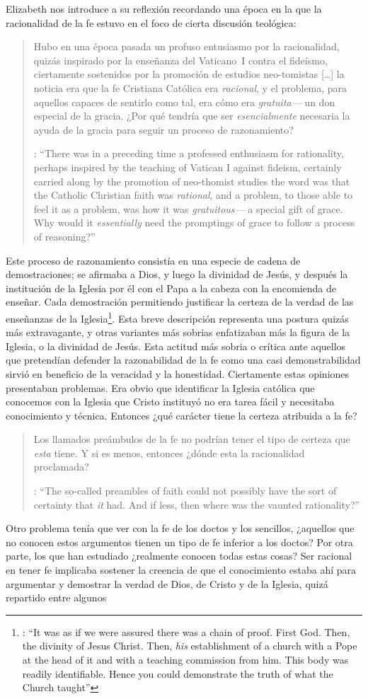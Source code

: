 Elizabeth nos introduce a su reflexión recordando una época en la que la racionalidad de la fe estuvo en el foco de cierta discusión teológica: \blockquote[{\cite[113]{anscombe1981erp:faith}}: \enquote{There was in a preceding time a professed enthusiasm for rationality, perhaps inspired by the teaching of Vatican I against fideism, certainly carried along by the promotion of neo-thomist studies \textelp{} the word was that the Catholic Christian faith was \emph{rational}, and a problem, to those able to feel it as a problem, was how it was \emph{gratuitous}\,---\,a special gift of grace. Why would it \emph{essentially} need the promptings of grace to follow a process of reasoning?}]{Hubo en una época pasada un profuso entusiasmo por la racionalidad, quizás inspirado por la enseñanza del Vaticano~I contra el fideísmo, ciertamente sostenidos por la promoción de estudios neo-tomistas [\ldots] la noticia era que la fe Cristiana Católica era \emph{racional}, y el problema, para aquellos capaces de sentirlo como tal, era cómo era \emph{gratuita}\,---\,un don especial de la gracia. ¿Por qué tendría que ser \emph{esencialmente} necesaria la ayuda de la gracia para seguir un proceso de razonamiento?}. Este proceso de razonamiento consistía en una especie de cadena de demostraciones; se afirmaba a Dios, y luego la divinidad de Jesús, y después la institución de la Iglesia por él con el Papa a la cabeza con la encomienda de enseñar. Cada demostración permitiendo justificar la certeza de la verdad de las enseñanzas de la Iglesia\footnote{\cite[Cf.~][12]{anscombe1981erp:faith}: \enquote{It was as if we were assured there was a chain of proof. First God. Then, the divinity of Jesus Christ. Then, \emph{his} establishment of a church with a Pope at the head of it and with a teaching commission from him. This body was readily identifiable. Hence you could demonstrate the truth of what the Church taught}}. Esta breve descripción representa una postura quizás más extravagante, y otras variantes más sobrias enfatizaban más la figura de la Iglesia, o la divinidad de Jesús. Esta actitud más sobria o crítica ante aquellos que pretendían defender la razonabilidad de la fe como una casi demonstrabilidad sirvió en beneficio de la veracidad y la honestidad. Ciertamente estas opiniones presentaban problemas. Era obvio que identificar la Iglesia católica que conocemos con la Iglesia que Cristo instituyó no era tarea fácil y necesitaba conocimiento y técnica. Entonces ¿qué carácter tiene la certeza atribuida a la fe? \blockquote[{\cite[114]{anscombe1981erp:faith}}: \enquote{The so-called preambles of faith could not possibly have the sort of certainty that \emph{it} had. And if less, then where was the vaunted rationality?}]{Los llamados preámbulos de la fe no podrían tener el tipo de certeza que \emph{esta} tiene. Y si es menos, entonces ¿dónde esta la racionalidad proclamada?}. Otro problema tenía que ver con la fe de los doctos y los sencillos, ¿aquellos que no conocen estos argumentos tienen un tipo de fe inferior a los doctos? Por otra parte, los que han estudiado ¿realmente conocen todas estas cosas? Ser racional en tener fe implicaba sostener la creencia de que el conocimiento estaba ahí para argumentar y demostrar la verdad de Dios, de Cristo y de la Iglesia, quizá repartido entre algunos 